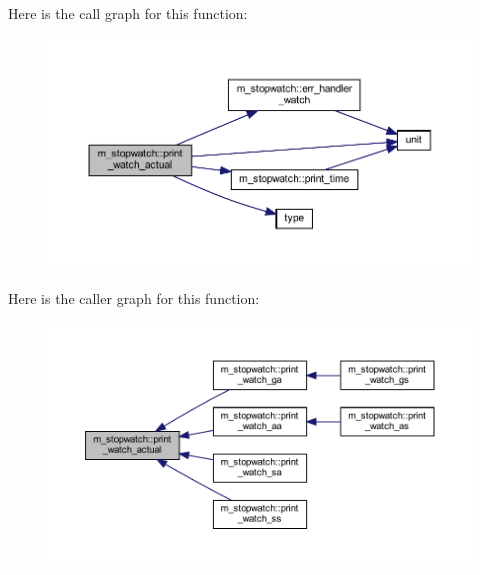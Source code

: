 Here is the call graph for this function\+:
\nopagebreak
\begin{figure}[H]
\begin{center}
\leavevmode
\includegraphics[width=350pt]{namespacem__stopwatch_a7c7423ee45c538535f59517d5a34abba_cgraph}
\end{center}
\end{figure}
Here is the caller graph for this function\+:
\nopagebreak
\begin{figure}[H]
\begin{center}
\leavevmode
\includegraphics[width=350pt]{namespacem__stopwatch_a7c7423ee45c538535f59517d5a34abba_icgraph}
\end{center}
\end{figure}
\mbox{\label{namespacem__stopwatch_a8c401a6a0108a2cd08e46cc5c9694f81}} 
